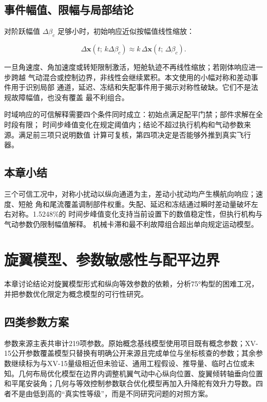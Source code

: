 \documentclass[UTF8,12pt,oneside,openany,fontset=windows]{ctexbook}
\begin{document}
\section{事件幅值、限幅与局部结论}

对阶跃幅值 \(\Delta\beta_c\) 足够小时，初始响应近似按幅值线性缩放：

\begin{equation}
\Delta\mathbf x(t;\,k\Delta\beta_c)\approx
k\,\Delta\mathbf x(t;\,\Delta\beta_c).
\end{equation}

一旦角速度、角加速度或转矩限制激活，短舱轨迹不再线性缩放；若刚体响应进一步跨越 气动混合或控制边界，非线性会继续累积。本文使用的小幅对称和差动事件用于识别局部 通道，延迟、冻结和失配事件用于揭示对称性破缺。它们不是法规故障幅值，也没有覆盖 最不利组合。

时域响应的可信解释需要四个条件同时成立：初始点满足配平门禁；部件求解在全时段有限； 时间步峰值变化在规定阈值内；结论不超过执行机构和气动参数来源。满足前三项只说明数值 计算可复核，第四项决定是否能够外推到真实飞行器。

\section{本章小结}

三个可信工况中，对称小扰动以纵向通道为主，差动小扰动均产生横航向响应；速度、短舱 角和尾流覆盖调制部件权重。失配、延迟和冻结通过瞬时差动量破坏左右对称。1.5248\%的 时间步峰值变化支持当前设置下的数值稳定性，但执行机构与气动参数仍限制幅值解释。 机械卡滞和最不利故障组合超出单向规定运动模型。

\chapter{旋翼模型、参数敏感性与配平边界}

本章讨论结论对旋翼模型形式和纵向等效参数的依赖，分析75°构型的困难工况，并把参数优化限定为概念模型的可行性研究。

\section{四类参数方案}

参数来源主表共审计219项参数。原始概念基线模型使用项目既有概念参数；XV-15公开参数覆盖模型只替换有明确公开来源且完成单位与坐标核查的参数；其余参数继续标为与XV-15量级相近但未验证、通用工程假设、推导量、临时占位或未知。几何布局优化模型在边界内调整机翼气动中心纵向位置、旋翼倾转轴垂向位置和平尾安装角；几何与等效控制参数联合优化模型再加入升降舵有效升力导数。四者不是由低到高的“真实性等级”，而是不同研究问题的对照方案。
\end{document}
